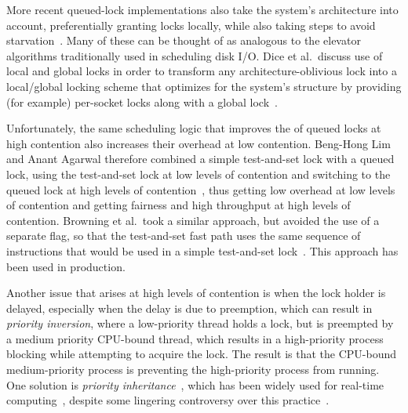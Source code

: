 More recent queued-lock implementations also take the system's architecture
into account, preferentially granting locks locally, while also taking
steps to avoid
starvation~\cite{McKenney02e,radovic03hierarchical,radovic02efficient,BenJackson02,McKenney02d}.
Many of these can be thought of as analogous to the elevator algorithms
traditionally used in scheduling disk I/O\@.
Dice et al.~discuss use of local and global locks in order to transform
any architecture-oblivious lock into a local/global locking scheme
that optimizes for the system's structure by providing (for example)
per-socket locks along with a global
lock~\cite{DavidDice2012NUMAlock1,DavidDice2012NUMAlock2}.

Unfortunately, the same scheduling logic that improves the 
of queued locks at high contention also increases their overhead at
low contention.
Beng-Hong Lim and Anant Agarwal therefore combined a simple test-and-set
lock with a queued lock, using the test-and-set lock at low levels of
contention and switching to the queued lock at high levels of
contention~\cite{BengHongLim94}, thus getting low overhead at low levels
of contention and getting fairness and high throughput at high levels
of contention.
Browning et al.\ took a similar approach, but avoided the use of a separate
flag, so that the test-and-set fast path uses the same sequence of
instructions that would be used in a simple test-and-set
lock~\cite{LukeBrowning2005SimpleLockNUMAAware}.
This approach has been used in production.

Another issue that arises at high levels of contention is when the
lock holder is delayed, especially when the delay is due to
preemption, which can result in \emph{priority inversion},
where a low-priority thread holds a lock, but is preempted
by a medium priority CPU-bound thread, which results in
a high-priority process blocking while attempting to acquire the
lock.
The result is that the CPU-bound medium-priority process is preventing the
high-priority process from running.
One solution is \emph{priority inheritance}~\cite{Lampson1980Mesa},
which has been widely used for real-time
computing~\cite{LuiSha1990PriorityInheritance,JonathanCorbet2006PriorityInheritance},
despite some lingering controversy over this
practice~\cite{Yodaiken2004FSM,DougLocke2002a}.


